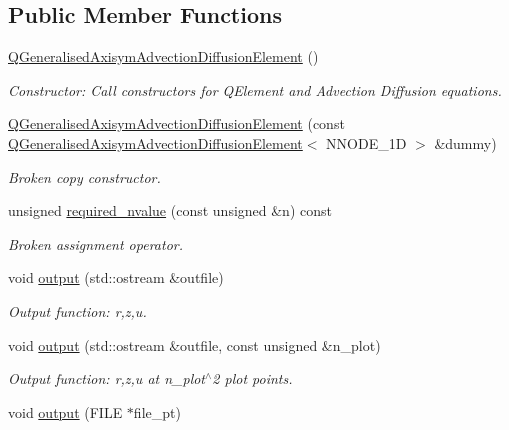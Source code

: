 \subsection*{Public Member Functions}
\begin{DoxyCompactItemize}
\item 
\hyperlink{classQGeneralisedAxisymAdvectionDiffusionElement_a9761e7a7dfe27cf81f8fa5ce07150123}{Q\+Generalised\+Axisym\+Advection\+Diffusion\+Element} ()
\begin{DoxyCompactList}\small\item\em Constructor\+: Call constructors for Q\+Element and Advection Diffusion equations. \end{DoxyCompactList}\item 
\hyperlink{classQGeneralisedAxisymAdvectionDiffusionElement_a02ffb84281318b258dff327a3458dba1}{Q\+Generalised\+Axisym\+Advection\+Diffusion\+Element} (const \hyperlink{classQGeneralisedAxisymAdvectionDiffusionElement}{Q\+Generalised\+Axisym\+Advection\+Diffusion\+Element}$<$ N\+N\+O\+D\+E\+\_\+1D $>$ \&dummy)
\begin{DoxyCompactList}\small\item\em Broken copy constructor. \end{DoxyCompactList}\item 
unsigned \hyperlink{classQGeneralisedAxisymAdvectionDiffusionElement_a90c0ea92a8f9f454c072f485d8b5ba6c}{required\+\_\+nvalue} (const unsigned \&n) const
\begin{DoxyCompactList}\small\item\em Broken assignment operator. \end{DoxyCompactList}\item 
void \hyperlink{classQGeneralisedAxisymAdvectionDiffusionElement_a27d90ccfbecff454ee6d15ea44b1c956}{output} (std\+::ostream \&outfile)
\begin{DoxyCompactList}\small\item\em Output function\+: r,z,u. \end{DoxyCompactList}\item 
void \hyperlink{classQGeneralisedAxisymAdvectionDiffusionElement_a8af9ea616644aac1a96d7e6647ce9cf5}{output} (std\+::ostream \&outfile, const unsigned \&n\+\_\+plot)
\begin{DoxyCompactList}\small\item\em Output function\+: r,z,u at n\+\_\+plot$^\wedge$2 plot points. \end{DoxyCompactList}\item 
void \hyperlink{classQGeneralisedAxisymAdvectionDiffusionElement_a50bc8d92910239c2fda6e65950042f05}{output} (F\+I\+LE $\ast$file\+\_\+pt)

\end{DoxyCompactItemize}
